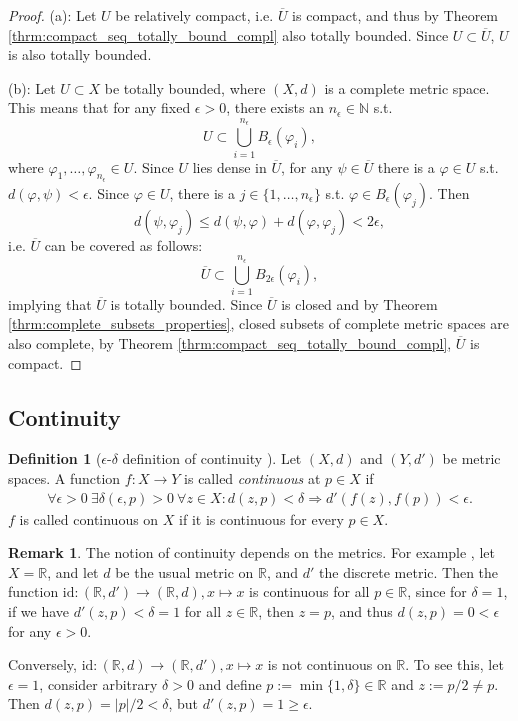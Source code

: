 \documentclass[12pt, a4paper]{article}
\numberwithin{equation}{section}
\theoremstyle{definition}
\theoremstyle{definition}
\newtheorem{defn}[thm]{Definition} %
\newtheorem{remark}[thm]{Remark} %
\newcommand{\abs}[1]{\left\vert #1 \right\vert}
\begin{document}
	\begin{proof}
		(a): Let $U$ be relatively compact, i.e. $\overline{U}$ is compact, and thus by Theorem \ref{thrm:compact_seq_totally_bound_compl} also totally bounded. Since $U\subset \overline{U}$, $U$ is also totally bounded.
		
		(b): Let $U\subset X$ be totally bounded, where $(X, d)$ is a complete metric space. This means that for any fixed $\epsilon > 0$, there exists an $n_{\epsilon}\in\mathbb N$ s.t.
		$$U\subset \bigcup_{i=1}^{n_{\epsilon}}B_{\epsilon}(\varphi_i),$$
		where $\varphi_1, \dots, \varphi_{n_{\epsilon}}\in U$. Since $U$ lies dense in $\overline{U}$, for any $\psi\in\overline{U}$ there is a $\varphi\in U$ s.t. $d(\varphi, \psi) < \epsilon$. Since $\varphi\in U$, there is a $j\in\{1, \dots, n_{\epsilon}\}$ s.t. $\varphi\in B_{\epsilon}(\varphi_j)$. Then
		$$d(\psi, \varphi_j) \leq d(\psi, \varphi) + d(\varphi, \varphi_j) < 2\epsilon,$$
		i.e. $\overline{U}$ can be covered as follows:
		$$\overline{U}\subset \bigcup_{i=1}^{n_{\epsilon}}B_{2\epsilon}(\varphi_i),$$ implying that $\overline{U}$ is totally bounded. Since $\overline{U}$ is closed and by Theorem \ref{thrm:complete_subsets_properties}, closed subsets of complete metric spaces are also complete, by Theorem \ref{thrm:compact_seq_totally_bound_compl}, $\overline{U}$ is compact.
	\end{proof}
	
	\newpage 
	\subsection{Continuity}
	\begin{defn}[$\epsilon$-$\delta$ definition of continuity \cite{MfPI}]\label{defn:continuity}
		Let $(X, d)$ and $(Y, d')$ be metric spaces. A function $f: X\rightarrow Y$ is called \textit{continuous} at $p\in X$ if 
		\begin{align}
			\forall \epsilon > 0\ \exists \delta(\epsilon, p) > 0\ \forall z\in X: d\left(z, p\right) < \delta \Rightarrow d'\left( f\left(z\right), f\left(p\right) \right) < \epsilon.  
		\end{align}
		$f$ is called continuous on $X$ if it is continuous for every $p\in X$.
	\end{defn}

	\begin{remark}
		The notion of continuity depends on the metrics. For example \cite{2087322}, let $X = \mathbb R$, and let $d$ be the usual metric on $\mathbb R$, and $d'$ the discrete metric. Then the function $\text{id}: (\mathbb R, d') \to (\mathbb R, d), x\mapsto x$ is continuous for all $p\in \mathbb R$, since for $\delta = 1$, if we have $d'(z, p) < \delta = 1$ for all $z\in\mathbb R$, then $z = p$, and thus $d(z, p) = 0 < \epsilon$ for any $\epsilon > 0$.
		
		Conversely, $\text{id}: (\mathbb R, d) \to (\mathbb R, d'), x\mapsto x$ is not continuous on $\mathbb R$. To see this, let $\epsilon = 1$, consider arbitrary $\delta > 0$ and define $p := \min\{1, \delta\}\in\mathbb R$ and $z := p/2\ne p$. Then $d(z, p) = \abs{p}/2 < \delta$, but $d'(z, p) = 1 \geq \epsilon$.
	\end{remark}
\end{document}
